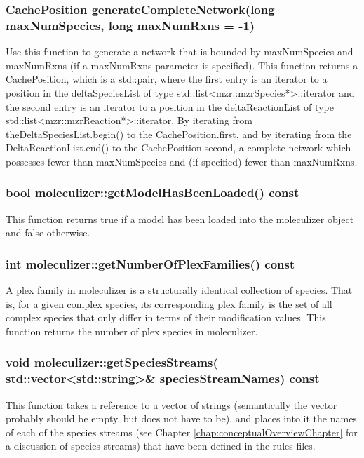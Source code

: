 \subsubsection{ CachePosition
        generateCompleteNetwork(long maxNumSpecies, long maxNumRxns =
        -1) }

Use this function to generate a network that is bounded by
maxNumSpecies and maxNumRxns (if a maxNumRxns parameter is
specified).  This function returns a CachePosition, which is a
std::pair, where the first entry is an iterator to a position
in the deltaSpeciesList of type std::list<mzr::mzrSpecies*>::iterator
and the second entry is an iterator to a position in the
deltaReactionList of type std::list<mzr::mzrReaction*>::iterator.  By
iterating from theDeltaSpeciesList.begin() to the CachePosition.first,
and by iterating from the DeltaReactionList.end() to the
CachePosition.second, a complete network which possesses fewer than
maxNumSpecies and (if specified) fewer than maxNumRxns.

\subsubsection{bool moleculizer::getModelHasBeenLoaded() const}
This function returns true if a model has been loaded into the
moleculizer object and false otherwise.  

\subsubsection{int moleculizer::getNumberOfPlexFamilies() const}
A plex family in moleculizer is a structurally identical collection of
species.  That is, for a given complex species, its corresponding plex
family is the set of all complex species that only differ in terms of
their modification values.  This function returns the number of plex
species in moleculizer.  

\subsubsection{void moleculizer::getSpeciesStreams(
  std::vector<std::string>\& speciesStreamNames) const}
This function takes a reference to a vector of strings (semantically
the vector probably should be empty, but does not have to be), and
places into it the names of each of the species streams (see Chapter
\ref{chap:conceptualOverviewChapter} for a discussion of species
streams) that have been defined in the rules files.  

